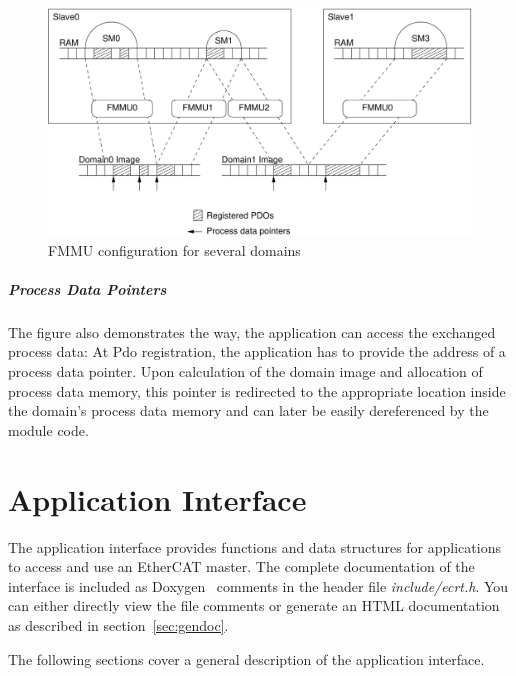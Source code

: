 \documentclass[a4paper,12pt,BCOR6mm,bibtotoc,idxtotoc]{scrbook}
\begin{document}
\begin{figure}[htbp]
  \centering
  \includegraphics[width=\textwidth]{images/fmmus}
  \caption{FMMU configuration for several domains}
  \label{fig:fmmus}
\end{figure}

\paragraph{Process Data Pointers} %

The figure also demonstrates the way, the application can access the exchanged
process data: At Pdo registration, the application has to provide the address
of a process data pointer. Upon calculation of the domain image and allocation
of process data memory, this pointer is redirected to the appropriate location
inside the domain's process data memory and can later be easily dereferenced by
the module code.


\chapter{Application Interface}
\label{sec:ecrt}

The application interface provides functions and data structures for
applications to access and use an EtherCAT master. The complete documentation
of the interface is included as Doxygen~\cite{doxygen} comments in the header
file \textit{include/ecrt.h}. You can either directly view the file comments
or generate an HTML documentation as described in section~\ref{sec:gendoc}.

The following sections cover a general description of the application
interface.
\end{document}

